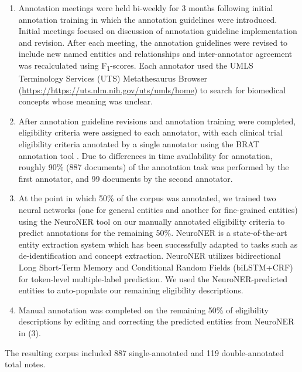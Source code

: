 \documentclass[../main.tex]{subfiles}
\begin{document}
\begin{enumerate}
    \item Annotation meetings were held bi-weekly for 3 months following initial annotation training in which the annotation guidelines were introduced. Initial meetings focused on discussion of annotation guideline implementation and revision. After each meeting, the annotation guidelines were revised to include new named entities and relationships and inter-annotator agreement was recalculated using F\textsubscript{1}-scores. Each annotator used the UMLS Terminology Services (UTS) Metathesaurus Browser (\url{https://https://uts.nlm.nih.gov/uts/umls/home}) to search for biomedical concepts whose meaning was unclear.
    \item After annotation guideline revisions and annotation training were completed, eligibility criteria were assigned to each annotator, with each clinical trial eligibility criteria annotated by a single annotator using the BRAT annotation tool \cite{stenetorp2012brat}. Due to differences in time availability for annotation, roughly 90\% (887 documents) of the annotation task was performed by the first annotator, and 99 documents by the second annotator.
    \item At the point in which 50\% of the corpus was annotated, we trained two neural networks (one for general entities and another for fine-grained entities) using the NeuroNER tool \cite{dernoncourt2017neuroner} on our manually annotated eligibility criteria to predict annotations for the remaining 50\%. NeuroNER is a state-of-the-art entity extraction system which has been successfully adapted to tasks such as de-identification and concept extraction. NeuroNER utilizes bidirectional Long Short-Term Memory and Conditional Random Fields (biLSTM+CRF) for token-level multiple-label prediction. We used the NeuroNER-predicted entities to auto-populate our remaining eligibility descriptions.
    \item Manual annotation was completed on the remaining 50\% of eligibility descriptions by editing and correcting the predicted entities from NeuroNER in (3).

\end{enumerate}    
    
\noindent The resulting corpus included 887 single-annotated and 119 double-annotated total notes.    
\end{document}
